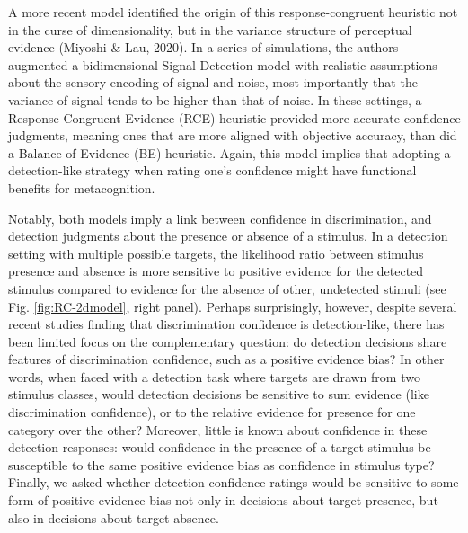 \documentclass[12pt,twoside]{reedthesis}
\begin{document}
A more recent model identified the origin of this response-congruent heuristic not in the curse of dimensionality, but in the variance structure of perceptual evidence (Miyoshi \& Lau, 2020). In a series of simulations, the authors augmented a bidimensional Signal Detection model with realistic assumptions about the sensory encoding of signal and noise, most importantly that the variance of signal tends to be higher than that of noise. In these settings, a Response Congruent Evidence (RCE) heuristic provided more accurate confidence judgments, meaning ones that are more aligned with objective accuracy, than did a Balance of Evidence (BE) heuristic. Again, this model implies that adopting a detection-like strategy when rating one's confidence might have functional benefits for metacognition.

Notably, both models imply a link between confidence in discrimination, and detection judgments about the presence or absence of a stimulus. In a detection setting with multiple possible targets, the likelihood ratio between stimulus presence and absence is more sensitive to positive evidence for the detected stimulus compared to evidence for the absence of other, undetected stimuli (see Fig. \ref{fig:RC-2dmodel}, right panel). Perhaps surprisingly, however, despite several recent studies finding that discrimination confidence is detection-like, there has been limited focus on the complementary question: do detection decisions share features of discrimination confidence, such as a positive evidence bias? In other words, when faced with a detection task where targets are drawn from two stimulus classes, would detection decisions be sensitive to sum evidence (like discrimination confidence), or to the relative evidence for presence for one category over the other? Moreover, little is known about confidence in these detection responses: would confidence in the presence of a target stimulus be susceptible to the same positive evidence bias as confidence in stimulus type? Finally, we asked whether detection confidence ratings would be sensitive to some form of positive evidence bias not only in decisions about target presence, but also in decisions about target absence.
\end{document}

